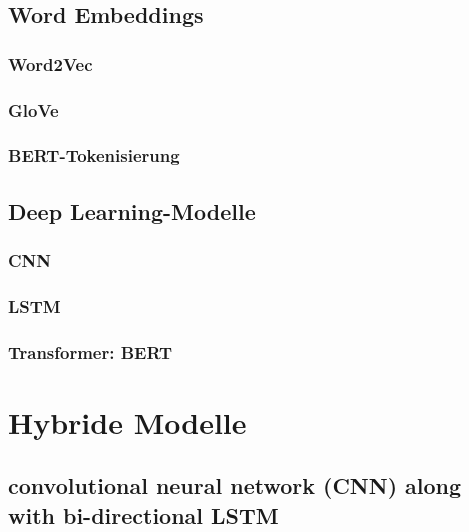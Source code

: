 \subsection{Word Embeddings}
\label{sec:word_embeddings}

\subsubsection{Word2Vec}

\subsubsection{GloVe}

\subsubsection{BERT-Tokenisierung}


\subsection{Deep Learning-Modelle}
\label{sec:deep_learning_modelle}

\subsubsection{CNN}

\subsubsection{LSTM}

\subsubsection{Transformer: BERT}


\section{Hybride Modelle}
\label{sec:hybride_modelle}

\subsection{convolutional neural network (CNN) along with bi-directional LSTM}

\cite{Buddhadev2025}


